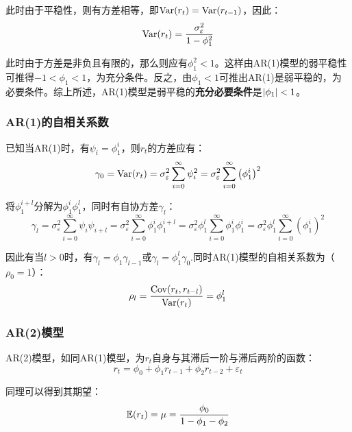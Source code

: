 \documentclass[11pt]{article}
\begin{document}
此时由于平稳性，则有方差相等，即$\operatorname{Var}(r_{t}) = \operatorname{Var}(r_{t-1})$，因此：
\begin{equation*}
    \operatorname{Var}(r_{t}) = \frac{\sigma_{\varepsilon}^{2}}{1-\phi_{1}^{2}}
\end{equation*}

此时由于方差是非负且有限的，那么则应有$\phi_{1}^{2}<1$。这样由AR(1)模型的弱平稳性可推得$-1<\phi_1<1$，为充分条件。反之，由$\phi_1<1$可推出AR(1)是弱平稳的，为必要条件。综上所述，AR(1)模型是弱平稳的\textbf{充分必要条件}是$\left\lvert \phi_1\right\rvert<1$。

\subsubsection*{AR(1)的自相关系数}

已知当AR(1)时，有$\psi_i = \phi_1^i$，则$r_t$的方差应有：
\begin{equation*}
    \gamma_0 = \operatorname{Var}(r_t) = \sigma_{\varepsilon}^{2}\sum_{i=0}^{\infty} \psi_{i}^{2}
    = \sigma_{\varepsilon}^{2}\sum_{i=0}^{\infty} \left( \phi_1^{i}\right)^{2}
\end{equation*}

将$\phi_1^{i+l}$分解为$\phi_1^{i}\phi_1^{l}$，同时有自协方差$\gamma_l$：
\begin{equation*}
    \gamma_l = \sigma_{\varepsilon}^{2} \sum_{i=0}^{\infty} \psi_i \psi_{i+l} 
    = \sigma_{\varepsilon}^{2} \sum_{i=0}^{\infty} \phi_1^i \phi_1^{i+l} 
    = \sigma_{\varepsilon}^{2} \phi_1^{l} \sum_{i=0}^{\infty} \phi_1^i \phi_1^{i} 
    = \sigma_{\varepsilon}^{2} \phi_1^{l} \sum_{i=0}^{\infty} \left( \phi_1^i \right)^2
\end{equation*}

因此有当$l>0$时，有$\gamma_l=\phi_1 \gamma_{l-1}$或$\gamma_l=\phi_1^l \gamma_{0}$.同时AR(1)模型的自相关系数为（$\rho_0=1$）：
\begin{equation*}
    \rho_l = \frac{\operatorname{Cov}(r_t,r_{t-l})}{\operatorname{Var}(r_t)} = \phi_1^l
\end{equation*}

\subsubsection*{AR(2)模型}

AR(2)模型，如同AR(1)模型，为$r_t$自身与其滞后一阶与滞后两阶的函数：
\begin{equation*}
    r_t = \phi_0 + \phi_1 r_{t-1} + \phi_2 r_{t-2} + \varepsilon_t
\end{equation*}

同理可以得到其期望：
\begin{equation*}
    \mathbb{E}(r_t) = \mu = \frac{\phi_0}{1-\phi_1-\phi_2}
\end{equation*}
\end{document}
